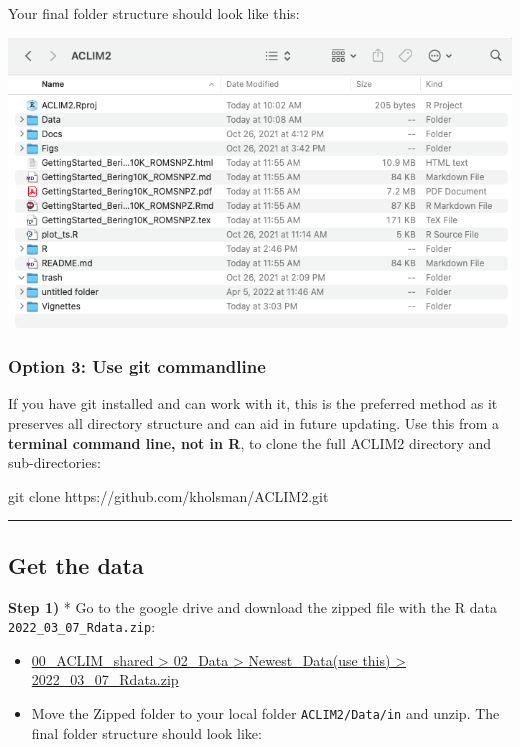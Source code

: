 \documentclass[
]{article}
\newenvironment{Shaded}{\begin{snugshade}}{\end{snugshade}}
\newcommand{\FunctionTok}[1]{\textcolor[rgb]{0.00,0.00,0.00}{#1}}
\newcommand{\NormalTok}[1]{#1}
\begin{document}
Your final folder structure should look like this:

\includegraphics[width=1\textwidth,height=\textheight]{Figs/ACLIM_dir.png}

\hypertarget{option-3-use-git-commandline}{%
\subsubsection{Option 3: Use git
commandline}\label{option-3-use-git-commandline}}

If you have git installed and can work with it, this is the preferred
method as it preserves all directory structure and can aid in future
updating. Use this from a \textbf{terminal command line, not in R}, to
clone the full ACLIM2 directory and sub-directories:

\begin{Shaded}
\begin{Highlighting}[]
    \FunctionTok{git}\NormalTok{ clone https://github.com/kholsman/ACLIM2.git}
\end{Highlighting}
\end{Shaded}

\begin{center}\rule{0.5\linewidth}{0.5pt}\end{center}

\hypertarget{get-the-data}{%
\subsection{Get the data}\label{get-the-data}}

\textbf{Step 1)} * Go to the google drive and download the zipped file
with the R data \texttt{2022\_03\_07\_Rdata.zip}:

\begin{itemize}
\item
  \href{https://drive.google.com/drive/folders/11BQEfNEl9vvrN-V0LgS67XS4aLE9pNzz}{00\_ACLIM\_shared
  \textgreater{} 02\_Data \textgreater{} Newest\_Data(use this)
  \textgreater{} 2022\_03\_07\_Rdata.zip}
\item
  Move the Zipped folder to your local folder \texttt{ACLIM2/Data/in}
  and unzip. The final folder structure should look like:
\end{itemize}
\end{document}
